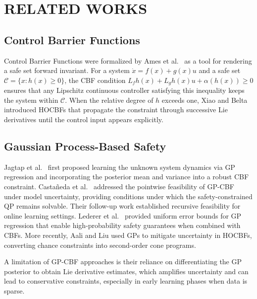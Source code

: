 \documentclass[letterpaper, 10 pt, conference]{ieeeconf}
\begin{document}
\section{RELATED WORKS}
\label{sec:related}

\subsection{Control Barrier Functions}

Control Barrier Functions were formalized by Ames et al.\ \cite{ames2017cbf} as a tool for rendering a safe set forward invariant. For a system $\dot{x} = f(x) + g(x)u$ and a safe set $\mathcal{C} = \{x : h(x) \geq 0\}$, the CBF condition $L_f h(x) + L_g h(x) u + \alpha(h(x)) \geq 0$ ensures that any Lipschitz continuous controller satisfying this inequality keeps the system within $\mathcal{C}$. When the relative degree of $h$ exceeds one, Xiao and Belta \cite{xiao2019hocbf} introduced HOCBFs that propagate the constraint through successive Lie derivatives until the control input appears explicitly.

\subsection{Gaussian Process-Based Safety}

Jagtap et al.\ \cite{jagtap2020gpcbf} first proposed learning the unknown system dynamics via GP regression and incorporating the posterior mean and variance into a robust CBF constraint. Casta\~{n}eda et al.\ \cite{castaneda2021pointwise} addressed the pointwise feasibility of GP-CBF under model uncertainty, providing conditions under which the safety-constrained QP remains solvable. Their follow-up work \cite{castaneda2022recursive} established recursive feasibility for online learning settings. Lederer et al.\ \cite{lederer2019uniform} provided uniform error bounds for GP regression that enable high-probability safety guarantees when combined with CBFs. More recently, Aali and Liu \cite{aali2024hocbfgp} used GPs to mitigate uncertainty in HOCBFs, converting chance constraints into second-order cone programs.

A limitation of GP-CBF approaches is their reliance on differentiating the GP posterior to obtain Lie derivative estimates, which amplifies uncertainty and can lead to conservative constraints, especially in early learning phases when data is sparse.
\end{document}
